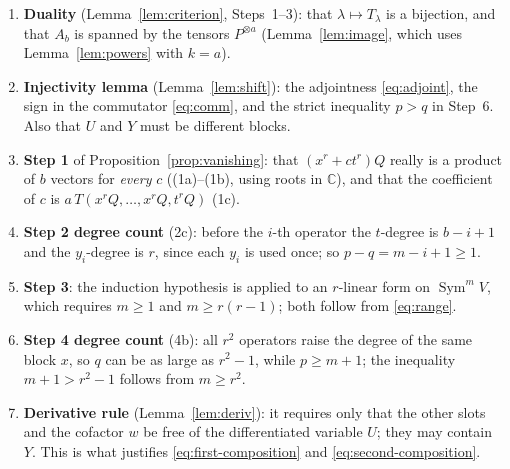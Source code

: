 \documentclass[11pt]{article}
\theoremstyle{remark}
\DeclareMathOperator{\Sym}{Sym}
\newcommand{\C}{\mathbb C}
\begin{document}
\begin{enumerate}[leftmargin=2em]
\item \textbf{Duality} (Lemma~\ref{lem:criterion}, Steps~1--3): that
$\lambda\mapsto T_\lambda$ is a bijection, and that $A_b$ is spanned by
the tensors $P^{\otimes a}$ (Lemma~\ref{lem:image}, which uses
Lemma~\ref{lem:powers} with $k=a$).
\item \textbf{Injectivity lemma} (Lemma~\ref{lem:shift}): the adjointness
\eqref{eq:adjoint}, the sign in the commutator \eqref{eq:comm}, and the
strict inequality $p>q$ in Step~6. Also that $U$ and $Y$ must be different
blocks.
\item \textbf{Step 1} of Proposition~\ref{prop:vanishing}: that
$(x^r+ct^r)Q$ really is a product of $b$ vectors for \emph{every} $c$
((1a)--(1b), using roots in $\C$), and that the coefficient of $c$ is
$a\,T(x^rQ,\dots,x^rQ,t^rQ)$ (1c).
\item \textbf{Step 2 degree count} (2c): before the $i$-th operator the
$t$-degree is $b-i+1$ and the $y_i$-degree is $r$, since each $y_i$ is used
once; so $p-q=m-i+1\ge1$.
\item \textbf{Step 3}: the induction hypothesis is applied to an $r$-linear
form on $\Sym^mV$, which requires $m\ge1$ and $m\ge r(r-1)$; both follow
from \eqref{eq:range}.
\item \textbf{Step 4 degree count} (4b): all $r^2$ operators raise the
degree of the same block $x$, so $q$ can be as large as $r^2-1$, while
$p\ge m+1$; the inequality $m+1>r^2-1$ follows from $m\ge r^2$.
\item \textbf{Derivative rule} (Lemma~\ref{lem:deriv}): it requires only
that the other slots and the cofactor $w$ be free of the differentiated
variable $U$; they may contain $Y$. This is what justifies
\eqref{eq:first-composition} and \eqref{eq:second-composition}.
\end{enumerate}
\end{document}
